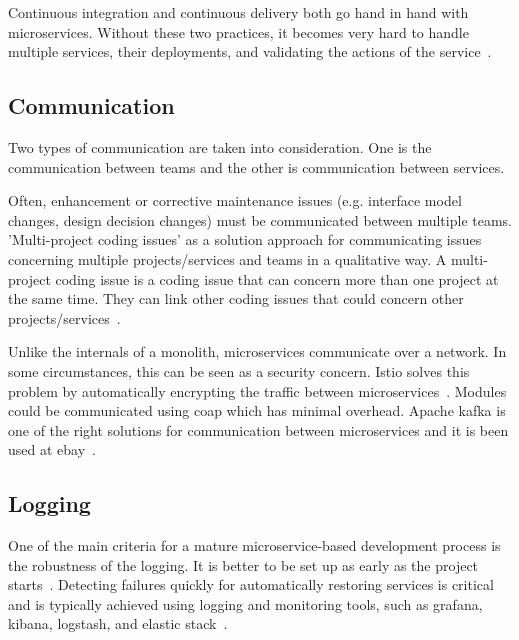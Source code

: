 \par Continuous integration and continuous delivery both go hand in hand with microservices. Without these two practices, it becomes very hard to handle multiple services, their deployments, and validating the actions of the service~\cite{Zhang2019, Kalske2017}. 


\subsection{Communication}%

Two types of communication are taken into consideration. One is the communication between teams and the other is communication between services.

\par Often, enhancement or corrective maintenance issues (e.g. interface model changes, design decision changes) must be communicated between multiple teams. 'Multi-project coding issues' as a solution approach for communicating issues concerning multiple projects/services and teams in a qualitative way. A multi-project coding issue is a coding issue that can concern more than one project at the same time. They can link other coding issues that could concern other projects/services~\cite{Speth2019}.

\par Unlike the internals of a monolith, microservices communicate over a network. In some circumstances, this can be seen as a security concern. Istio solves this problem by automatically encrypting the traffic between microservices~\cite{Zhang2019}.
Modules could be communicated using coap which has minimal overhead\cite{liu2018}. Apache kafka is one of the right solutions for communication between microservices and it is been used at ebay~\cite{Gonchar2017}.



\subsection{Logging}%

One of the main criteria for a mature microservice-based development process is the robustness of the logging. It is better to be set up as early as the project starts~\cite{wang2020}.
Detecting failures quickly for automatically restoring services is critical and is typically achieved using logging and monitoring tools, such as grafana, kibana, logstash, and elastic stack~\cite{KalskeM2017}.
 
